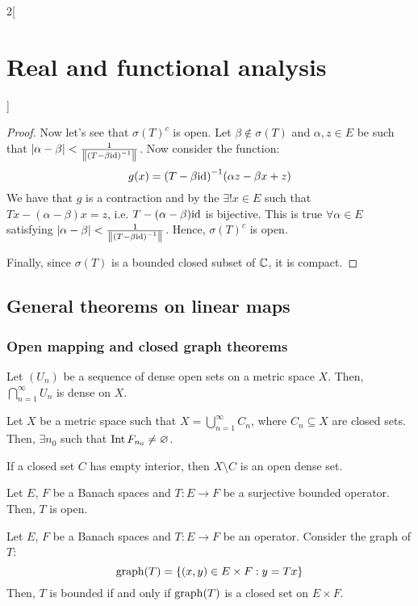 \documentclass[../../../main_math.tex]{subfiles}
\begin{document}
\begin{multicols}{2}[\section{Real and functional analysis}]
\begin{proof}
    Now let's see that ${\sigma(T)}^c$ is open. Let $\beta\notin\sigma(T)$ and $\alpha,z\in E$ be such that $\abs{\alpha-\beta}<\frac{1}{\left\|{(T-\beta\mathrm{id})}^{-1}\right\|}$. Now consider the function:
    $$g(x)={(T-\beta \mathrm{id})}^{-1}(\alpha z-\beta x +z)$$
    We have that $g$ is a contraction and by the  $\exists!x\in E$ such that $Tx-(\alpha-\beta) x=z$, i.e. $T-(\alpha-\beta)\mathrm{id}$ is bijective. This is true $\forall\alpha\in E$ satisfying $\abs{\alpha-\beta}<\frac{1}{\left\|{(T-\beta\mathrm{id})}^{-1}\right\|}$. Hence, ${\sigma(T)}^c$ is open.

    Finally, since $\sigma(T)$ is a bounded closed subset of $\mathbb{C}$, it is compact.
  \end{proof}
  \subsection{General theorems on linear maps}
  \subsubsection{Open mapping and closed graph theorems}
  \begin{theorem}
    Let $(U_n)$ be a sequence of dense open sets on a metric space $X$. Then, $\bigcap_{n=1}^\infty U_n$ is dense on $X$.
  \end{theorem}
  \begin{corollary}
    Let $X$ be a metric space such that $X=\bigcup_{n=1}^\infty C_n$, where $C_n\subseteq X$ are closed sets. Then, $\exists n_0$ such that $\operatorname{Int} F_{n_0}\ne \varnothing$.
  \end{corollary}
  \begin{sproof}
    If a closed set $C$ has empty interior, then $X\setminus C$ is an open dense set.
  \end{sproof}
  \begin{theorem}
    Let $E$, $F$ be a Banach spaces and $T:E\rightarrow F$ be a surjective bounded operator. Then, $T$ is open.
  \end{theorem}
  \begin{theorem}
    Let $E$, $F$ be a Banach spaces and $T:E\rightarrow F$ be an operator. Consider the graph of $T$: $$\operatorname{graph}(T)=\{(x,y)\in E\times F:y=Tx\}$$
    Then, $T$ is bounded if and only if $\operatorname{graph}(T)$ is a closed set on $E\times F$.
  \end{theorem}

\end{multicols}
\end{document}
